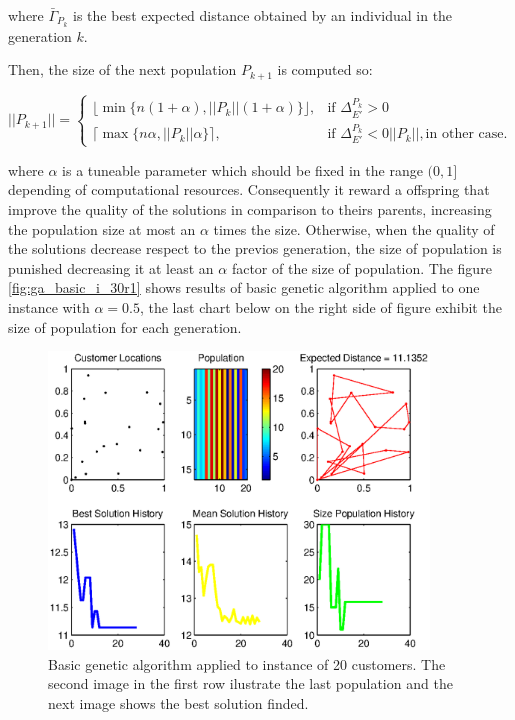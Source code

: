 where $\bar{\Gamma}_{P_k}$ is the best expected distance obtained by an individual in the generation $k$.

Then, the size of the next population $P_{k+1}$ is computed so:

\begin{equation}\label{eq:population_size}
 ||P_{k+1}|| = \left \{ \begin{array}{ll}
  \lfloor  \min\{n(1+\alpha), ||P_{k}||(1+\alpha)\} \rfloor, & \text{if } \Delta^{P_k}_{E'} > 0\\
  \lceil \max\{n\alpha, ||P_{k}||\alpha\} \rceil, & \text{if } \Delta^{P_k}_{E'} < 0
  ||P_{k}||, \text{in other case.}
  \end{array} \right.
\end{equation}


where $\alpha$ is a tuneable parameter which should be fixed in the range $(0,1]$ depending of computational resources. Consequently it reward a offspring that improve the quality of the solutions in comparison to theirs parents, increasing the population size at most an $\alpha$ times the size. Otherwise, when the quality of the solutions decrease respect to the previos generation, the size of population is punished decreasing it at least an $\alpha$ factor of the size of population. The figure \ref{fig:ga_basic_i_30r1} shows results of basic genetic algorithm applied to one instance with $\alpha = 0.5$, the last chart below on the right side of figure exhibit the size of population for each generation.

\begin{figure}[!htbp]
  \begin{center}
   \includegraphics[width=0.9\textwidth]{Images/Chapter3/mvi_20r4_m_regular.eps}
  \end{center}
    \caption{Basic genetic algorithm applied to instance of 20 customers. The second image in the first row ilustrate the last population and the next image shows the best solution finded. }\label{fig:ga_basic_mvi_20r4_m}
\end{figure}

